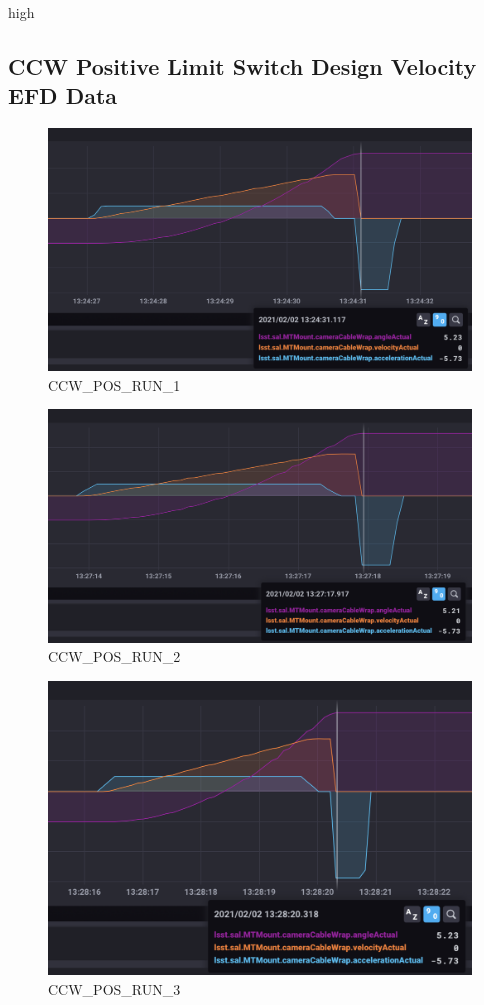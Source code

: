high\documentclass[SE,lsstdraft,authoryear,toc]{lsstdoc}
\begin{document}
\subsection{CCW Positive Limit Switch Design Velocity EFD Data}
\begin{figure}[h!]
  \includegraphics[width=\linewidth]{media/CCW_design_speed_pos_test1.png}
  \caption{CCW\_POS\_RUN\_1}
  \label{fig:CCW_POS_RUN_1}
\end{figure}
\begin{figure}[h!]
  \includegraphics[width=\linewidth]{media/CCW_design_speed_pos_test2.png}
  \caption{CCW\_POS\_RUN\_2}
  \label{fig:CCW_POS_RUN_2}
\end{figure}
\begin{figure}[h!]
  \includegraphics[width=\linewidth]{media/CCW_design_speed_pos_test3.png}
  \caption{CCW\_POS\_RUN\_3}
  \label{fig:CCW_POS_RUN_3}
\end{figure}
\end{document}
